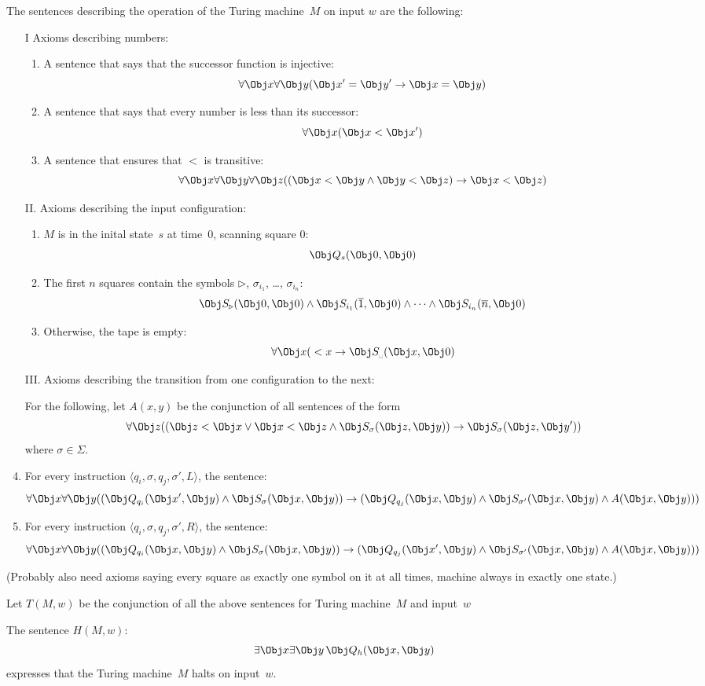 \documentclass[open-logic-section]{subfiles}
\begin{document}
The sentences describing the operation of the Turing machine~$M$ on
input $w$ are the following:
\begin{enumerate}
\item[I] Axioms describing numbers:
\begin{enumerate}
\item A sentence that says that the successor function is injective:
\[
\forall \Obj x \forall \Obj y(\leq[\Obj x'][\Obj y'] \lif \leq[\Obj x][\Obj y])
\]
\item A sentence that says that every number is less than its successor:
\[
\forall \Obj x(\Obj x < \Obj x')
\]
\item A sentence that ensures that $<$ is transitive:
\[
\forall \Obj x\forall \Obj y\forall \Obj z(
(\Obj x < \Obj y \land \Obj y < \Obj z) \lif \Obj x < \Obj z)
\]
\end{enumerate}
\item[II.] Axioms describing the input configuration:
\begin{enumerate}
\item $M$ is in the inital state~$s$ at time~0, scanning square 0:
\[
\Obj Q_s(\Obj 0, \Obj 0)
\]
\item The first $n$ squares contain the symbols $\triangleright$,
  $\sigma_{i_1}$, \dots, $\sigma_{i_n}$:
\[
\Obj S_\triangleright(\Obj 0, \Obj 0) \land 
\Obj S_{i_1}(\overline 1, \Obj 0) \land 
\dots \land
\Obj S_{i_n}(\overline n, \Obj 0) 
\]
\item Otherwise, the tape is empty:
\[
\forall \Obj x(\overline{} < x \lif \Obj
S_\text{\textvisiblespace}(\Obj x, \Obj 0)
\]
\end{enumerate}
\item[III.] Axioms describing the transition from one configuration to
  the next:

For the following, let $A(x, y)$ be the conjunction of all sentences
of the form
\[
\forall \Obj z(
(\Obj z < \Obj x \lor \Obj x < \Obj z \land \Obj S_\sigma(\Obj z, \Obj y)) 
\lif \Obj S_\sigma(\Obj z, \Obj y'))
\]
where $\sigma \in \Sigma$.
\item For every instruction $\langle q_i, \sigma, q_j, \sigma',
  L\rangle$, the sentence:
\[
\lforall[\Obj x] \lforall[\Obj y](
   (\Obj Q_{q_i}(\Obj x', \Obj y) \land \Obj S_{\sigma}(\Obj x, \Obj y)) \lif
   (\Obj Q_{q_j}(\Obj x, \Obj y) \land \Obj S_{\sigma'}(\Obj x, \Obj y) \land 
A(\Obj x, \Obj y)))
\]
\item For every instruction $\langle q_i, \sigma, q_j, \sigma',
  R\rangle$, the sentence:
\[
\lforall[\Obj x]\lforall[\Obj y](
   (\Obj Q_{q_i}(\Obj x, \Obj y) \land \Obj S_{\sigma}(\Obj x, \Obj y)) \lif
   (\Obj Q_{q_j}(\Obj x', \Obj y) \land \Obj S_{\sigma'}(\Obj x, \Obj y) \land 
A(\Obj x, \Obj y)))
\]
\end{enumerate}
(Probably also need axioms saying every square as exactly one symbol on
it at all times, machine always in exactly one state.)


Let $T(M, w)$ be the conjunction of all the above sentences for Turing
machine~$M$ and input~$w$

The sentence $H(M, w)$:
\[
\lexists[\Obj x]\lexists[\Obj y][\Obj Q_h(\Obj x, \Obj y)]
\]
expresses that the Turing machine~$M$ halts on input~$w$.
\end{document}
